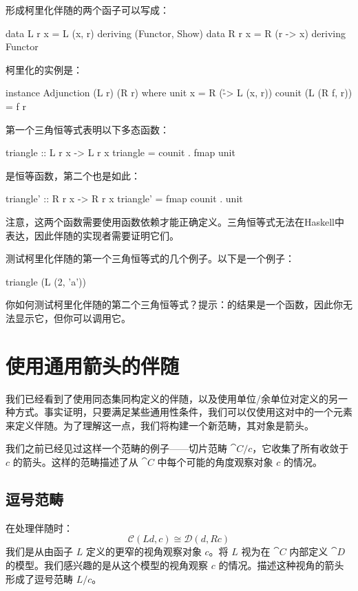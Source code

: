 \documentclass[DaoFP]{subfiles}
\begin{document}
形成柯里化伴随的两个函子可以写成：
\begin{haskell}
data L r x = L (x, r)    deriving (Functor, Show)
data R r x = R (r -> x)  deriving Functor
\end{haskell}
柯里化的实例是：
\begin{haskell}
instance Adjunction (L r) (R r) where
  unit x = R (\r -> L (x, r)) 
  counit (L (R f, r)) = f r
\end{haskell}
第一个三角恒等式表明以下多态函数：
\begin{haskell}
triangle :: L r x -> L r x
triangle = counit . fmap unit
\end{haskell}
是恒等函数，第二个也是如此：
\begin{haskell}
triangle' :: R r x -> R r x
triangle' = fmap counit . unit
\end{haskell}
注意，这两个函数需要使用函数依赖才能正确定义。三角恒等式无法在Haskell中表达，因此伴随的实现者需要证明它们。
\begin{exercise}
测试柯里化伴随的第一个三角恒等式的几个例子。以下是一个例子：
\begin{haskell}
triangle (L (2, 'a'))
\end{haskell}
\end{exercise}

\begin{exercise}
你如何测试柯里化伴随的第二个三角恒等式？提示：的结果是一个函数，因此你无法显示它，但你可以调用它。
\end{exercise}

\section{使用通用箭头的伴随}

我们已经看到了使用同态集同构定义的伴随，以及使用单位/余单位对定义的另一种方式。事实证明，只要满足某些通用性条件，我们可以仅使用这对中的一个元素来定义伴随。为了理解这一点，我们将构建一个新范畴，其对象是箭头。

我们之前已经见过这样一个范畴的例子——切片范畴 $\cat C/ c$，它收集了所有收敛于 $c$ 的箭头。这样的范畴描述了从 $\cat C$ 中每个可能的角度观察对象 $c$ 的情况。

\subsection{逗号范畴}
在处理伴随时：
\[  \mathcal{C} (L d, c) \cong \mathcal{D}( d , R c)\]
我们是从由函子 $L$ 定义的更窄的视角观察对象 $c$。将 $L$ 视为在 $\cat C$ 内部定义 $\cat D$ 的模型。我们感兴趣的是从这个模型的视角观察 $c$ 的情况。描述这种视角的箭头形成了逗号范畴 $L/c$。
\end{document}
